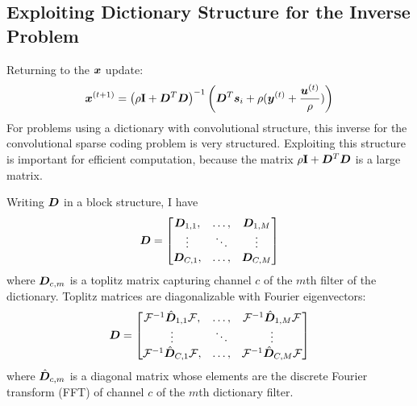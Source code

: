 \subsection{Exploiting Dictionary Structure for the Inverse Problem}
\label{subsection:SC xupdate}
Returning to the $\bm{x}$ update:
\begin{equation}
\bm{x}^{(t + 1)} = \left(\rho{\bf I} + \bm{D}^T\bm{D}\right)^{-1}\left(\bm{D}^T\bm{s}_i + \rho(\bm{y}^{(t)} + \frac{\bm{u}^{(t)}}{\rho})\right)
\end{equation}
%
For problems using a dictionary with convolutional structure, this inverse for the convolutional sparse coding problem is very structured. Exploiting this structure is important for efficient computation, because the matrix $\rho{\bf I} + \bm{D}^T\bm{D}$ is a large matrix.

Writing $\bm{D}$ in a block structure, I have
%
\begin{equation}
\bm{D} = \begin{bmatrix}
\bm{D}_{1,1}, & \hdots, & \bm{D}_{1,M}\\
\vdots & \ddots & \vdots\\
\bm{D}_{C,1}, & \hdots, & \bm{D}_{C,M}
\end{bmatrix}
\end{equation}
%
where $\bm{D}_{c,m}$ is a toplitz matrix capturing channel $c$ of the $m$th filter of the dictionary. Toplitz matrices are diagonalizable with Fourier eigenvectors:
%
\begin{equation}
\bm{D} = \begin{bmatrix}
\mathcal{F}^{-1}\hat{\bm{D}}_{1,1}\mathcal{F}, & \hdots, & \mathcal{F}^{-1}\hat{\bm{D}}_{1,M}\mathcal{F}\\
\vdots & \ddots & \vdots\\
\mathcal{F}^{-1}\hat{\bm{D}}_{C,1}\mathcal{F}, & \hdots, & \mathcal{F}^{-1}\hat{\bm{D}}_{C,M}\mathcal{F}
\end{bmatrix}
\end{equation}
%
where $\hat{\bm{D}}_{c,m}$ is a diagonal matrix whose elements are the discrete Fourier transform (FFT) of channel $c$ of the $m$th dictionary filter.

